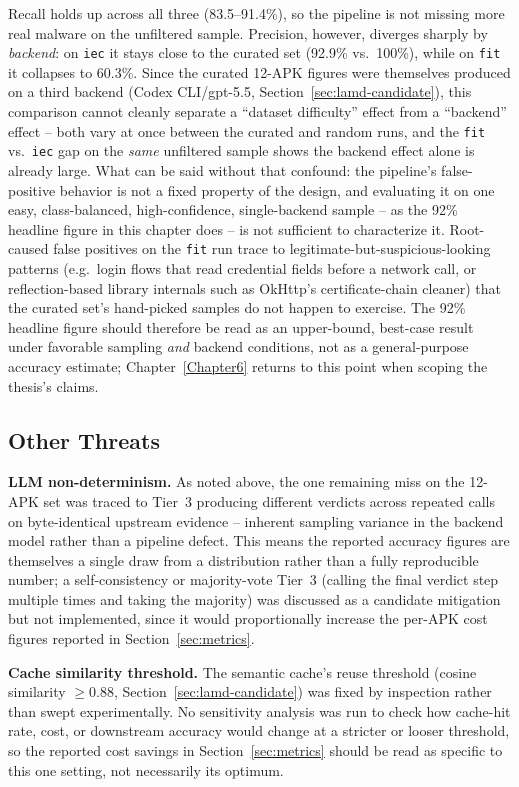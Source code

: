 Recall holds up across all three (83.5--91.4\%), so the pipeline is not
missing more real malware on the unfiltered sample. Precision, however,
diverges sharply by \emph{backend}: on \texttt{iec} it stays close to the
curated set (92.9\% vs.\ 100\%), while on \texttt{fit} it collapses to
60.3\%. Since the curated 12-APK figures were themselves produced on a
third backend (Codex CLI/gpt-5.5, Section~\ref{sec:lamd-candidate}), this
comparison cannot cleanly separate a ``dataset difficulty'' effect from a
``backend'' effect -- both vary at once between the curated and random
runs, and the \texttt{fit} vs.\ \texttt{iec} gap on the \emph{same}
unfiltered sample shows the backend effect alone is already large. What
can be said without that confound: the pipeline's false-positive behavior
is not a fixed property of the design, and evaluating it on one
easy, class-balanced, high-confidence, single-backend sample --
as the 92\% headline figure in this chapter does -- is not sufficient to
characterize it. Root-caused false positives on the \texttt{fit} run trace
to legitimate-but-suspicious-looking patterns (e.g.\ login flows that read
credential fields before a network call, or reflection-based library
internals such as OkHttp's certificate-chain cleaner) that the curated
set's hand-picked samples do not happen to exercise. The 92\% headline
figure should therefore be read as an upper-bound, best-case result under
favorable sampling \emph{and} backend conditions, not as a general-purpose
accuracy estimate; Chapter~\ref{Chapter6} returns to this point when
scoping the thesis's claims.

\subsection{Other Threats}

\textbf{LLM non-determinism.} As noted above, the one remaining miss on
the 12-APK set was traced to Tier~3
producing different verdicts across repeated calls on byte-identical
upstream evidence -- inherent sampling variance in the backend model
rather than a pipeline defect. This means the reported accuracy figures
are themselves a single draw from a distribution rather than a fully
reproducible number; a self-consistency or majority-vote Tier~3 (calling
the final verdict step multiple times and taking the majority) was
discussed as a candidate mitigation but not implemented, since it would
proportionally increase the per-APK cost figures reported in
Section~\ref{sec:metrics}.

\textbf{Cache similarity threshold.} The semantic cache's reuse threshold
(cosine similarity $\geq0.88$, Section~\ref{sec:lamd-candidate}) was fixed
by inspection rather than swept experimentally. No sensitivity analysis
was run to check how cache-hit rate, cost, or downstream accuracy would
change at a stricter or looser threshold, so the reported cost savings in
Section~\ref{sec:metrics} should be read as specific to this one setting,
not necessarily its optimum.
